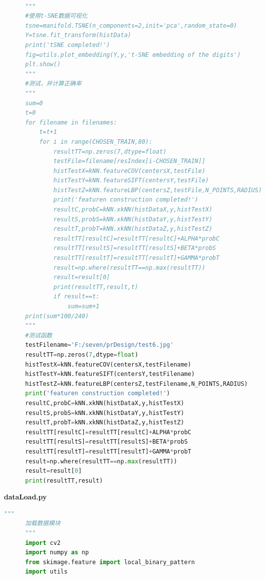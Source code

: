 \documentclass[supercite]{HustGraduPaper}
\begin{document}
\begin{sloppypar}
\begin{appendices}
\begin{spacing}{1.25}
\begin{lstlisting}[language=python]
      
      """
      #使用t-SNE数据可视化
      tsne=manifold.TSNE(n_components=2,init='pca',random_state=0)
      Y=tsne.fit_transform(histData)
      print('tSNE completed!')
      fig=utils.plot_embedding(Y,y,'t-SNE embedding of the digits')
      plt.show()
      """
      #测试，并计算正确率
      """
      sum=0
      t=0
      for filename in filenames:
          t=t+1
          for i in range(CHOSEN_TRAIN,80):
              resultTT=np.zeros(7,dtype=float)
              testFile=filename[resIndex[i-CHOSEN_TRAIN]]
              histTestX=kNN.featureCOV(centersX,testFile)
              histTestY=kNN.featureSIFT(centersY,testFile)
              histTestZ=kNN.featureLBP(centersZ,testFile,N_POINTS,RADIUS)
              print('featuren construction completed!')
              resultC,probC=kNN.xkNN(histDataX,y,histTestX)
              resultS,probS=kNN.xkNN(histDataY,y,histTestY)
              resultT,probT=kNN.xkNN(histDataZ,y,histTestZ)
              resultTT[resultC]=resultTT[resultC]+ALPHA*probC
              resultTT[resultS]=resultTT[resultS]+BETA*probS
              resultTT[resultT]=resultTT[resultT]+GAMMA*probT
              result=np.where(resultTT==np.max(resultTT))
              result=result[0]
              print(resultTT,result,t)
              if result==t:
                  sum=sum+1
      print(sum*100/240)
      """
      #测试函数
      testFilename='F:/seven/prDesign/test6.jpg'
      resultTT=np.zeros(7,dtype=float)
      histTestX=kNN.featureCOV(centersX,testFilename)
      histTestY=kNN.featureSIFT(centersY,testFilename)
      histTestZ=kNN.featureLBP(centersZ,testFilename,N_POINTS,RADIUS)
      print('featuren construction completed!')
      resultC,probC=kNN.xkNN(histDataX,y,histTestX)
      resultS,probS=kNN.xkNN(histDataY,y,histTestY)
      resultT,probT=kNN.xkNN(histDataZ,y,histTestZ)
      resultTT[resultC]=resultTT[resultC]+ALPHA*probC
      resultTT[resultS]=resultTT[resultS]+BETA*probS
      resultTT[resultT]=resultTT[resultT]+GAMMA*probT
      result=np.where(resultTT==np.max(resultTT))
      result=result[0]
      print(resultTT,result)
    \end{lstlisting}
    \end{spacing}
    \textbf{dataLoad.py}
    \begin{spacing}{1.25}
    \begin{lstlisting}[language=python]
      """
      加载数据模块
      """
      import cv2
      import numpy as np
      from skimage.feature import local_binary_pattern
      import utils
      

\end{lstlisting}
\end{spacing}
\end{appendices}
\end{sloppypar}
\end{document}
